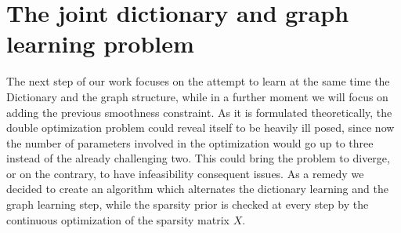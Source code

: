 \chapter{The joint dictionary and graph learning problem}
\label{sec:GD}
The next step of our work focuses on the attempt to learn at the same time the Dictionary and the graph structure, while in a further moment we will focus on adding the previous smoothness constraint. As it is formulated theoretically, the double optimization problem could reveal itself to be heavily ill posed, since now the number of parameters involved in the optimization would go up to three instead of the already challenging two. This could bring the problem to diverge, or on the contrary, to have infeasibility consequent issues. As a remedy we decided to create an algorithm which alternates the dictionary learning and the graph learning step, while the sparsity prior is checked at every step by the continuous optimization of the sparsity matrix $X$.

